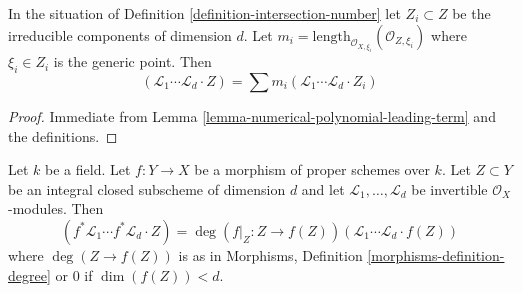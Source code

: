 \begin{lemma}
\label{lemma-intersection-number-in-terms-of-components}
In the situation of Definition \ref{definition-intersection-number}
let $Z_i \subset Z$ be the irreducible components of dimension $d$. Let
$m_i = \text{length}_{\mathcal{O}_{X, \xi_i}}(\mathcal{O}_{Z, \xi_i})$
where $\xi_i \in Z_i$ is the generic point. Then
$$
(\mathcal{L}_1 \cdots \mathcal{L}_d \cdot Z) =
\sum m_i(\mathcal{L}_1 \cdots \mathcal{L}_d \cdot Z_i)
$$
\end{lemma}

\begin{proof}
Immediate from Lemma \ref{lemma-numerical-polynomial-leading-term}
and the definitions.
\end{proof}

\begin{lemma}
\label{lemma-intersection-number-and-pullback}
Let $k$ be a field. Let $f : Y \to X$ be a morphism of proper schemes over $k$.
Let $Z \subset Y$ be an integral closed subscheme of dimension $d$ and let
$\mathcal{L}_1, \ldots, \mathcal{L}_d$ be invertible $\mathcal{O}_X$-modules.
Then
$$
(f^*\mathcal{L}_1 \cdots f^*\mathcal{L}_d \cdot Z) =
\deg(f|_Z : Z \to f(Z)) (\mathcal{L}_1 \cdots \mathcal{L}_d \cdot f(Z))
$$
where $\deg(Z \to f(Z))$ is as in
Morphisms, Definition \ref{morphisms-definition-degree}
or $0$ if $\dim(f(Z)) < d$.
\end{lemma}

